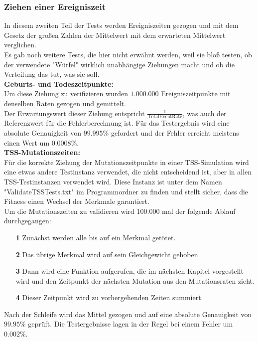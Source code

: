 \documentclass[11pt, a4paper, german]{article}
\theoremstyle{plain}
\begin{document}
	\subsubsection{Ziehen einer Ereigniszeit}
	In diesem zweiten Teil der Tests werden Ereigniszeiten gezogen und mit dem Gesetz der großen Zahlen der Mittelwert mit dem erwarteten Mittelwert verglichen.\\
	Es gab noch weitere Tests, die hier nicht erwähnt werden, weil sie bloß testen, ob der verwendete "{}Würfel"{} wirklich unabhängige Ziehungen macht und ob die Verteilung das tut, was sie soll.\\
	
	\textbf{Geburts- und Todeszeitpunkte:}\\
	Um diese Ziehung zu verifizieren wurden $ 1.000.000 $ Ereigniszeitpunkte mit denselben Raten gezogen und gemittelt.\\
	Der Erwartungswert dieser Ziehung entspricht $ \frac{1}{\text{TotalEventRate}} $, was auch der Referenzwert für die Fehlerberechnung ist. Für das Testergebnis wird eine absolute Genauigkeit von $ 99.995 \% $ gefordert und der Fehler erreicht meistens einen Wert um $ 0.0008\% $.\\
	
	\textbf{TSS-Mutationszeiten:}\\
	Für die korrekte Ziehung der Mutationszeitpunkte in einer TSS-Simulation wird eine etwas andere Testinstanz verwendet, die nicht entscheidend ist, aber in allen TSS-Testinstanzen verwendet wird. Diese Instanz ist unter dem Namen "{}ValidateTSSTests.txt"{} im Programmordner zu finden und stellt sicher, dass die Fitness einen Wechsel der Merkmale garantiert.\\
	Um die Mutationszeiten zu validieren wird 100.000 mal der folgende Ablauf durchgegangen:
	\begin{itemize}
		\item[\textbf{1}] Zunächst werden alle bis auf ein Merkmal getötet.
		\item[\textbf{2}] Das übrige Merkmal wird auf sein Gleichgewicht gehoben.
		\item[\textbf{3}] Dann wird eine Funktion aufgerufen, die im nächsten Kapitel vorgestellt wird und den Zeitpunkt der nächsten Mutation aus den Mutationsraten zieht.
		\item[\textbf{4}] Dieser Zeitpunkt wird zu vorhergehenden Zeiten summiert.
	\end{itemize}
	Nach der Schleife wird das Mittel gezogen und auf eine absolute Genauigkeit von $ 99.95\% $ geprüft. Die Testergebnisse lagen in der Regel bei einem Fehler um $ 0.002\% $.\\
	
\end{document}
